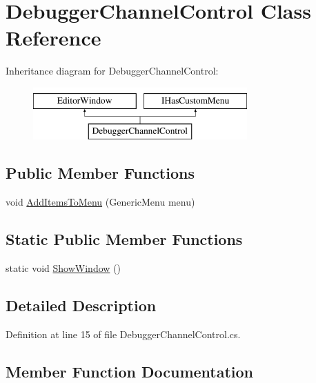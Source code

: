 \hypertarget{class_debugger_channel_control}{}\section{Debugger\+Channel\+Control Class Reference}
\label{class_debugger_channel_control}
Inheritance diagram for Debugger\+Channel\+Control\+:\begin{figure}[H]
\begin{center}
\leavevmode
\includegraphics[height=2.000000cm]{class_debugger_channel_control}
\end{center}
\end{figure}
\subsection*{Public Member Functions}
\begin{DoxyCompactItemize}
\item 
void \hyperlink{class_debugger_channel_control_aabf102e07c1cb002f8c600779bf956dc}{Add\+Items\+To\+Menu} (Generic\+Menu menu)
\end{DoxyCompactItemize}
\subsection*{Static Public Member Functions}
\begin{DoxyCompactItemize}
\item 
static void \hyperlink{class_debugger_channel_control_acf1e30aca1fdc865dc6ff648c558c4c9}{Show\+Window} ()
\end{DoxyCompactItemize}


\subsection{Detailed Description}


Definition at line 15 of file Debugger\+Channel\+Control.\+cs.



\subsection{Member Function Documentation}
\mbox{\label{class_debugger_channel_control_aabf102e07c1cb002f8c600779bf956dc}} 
